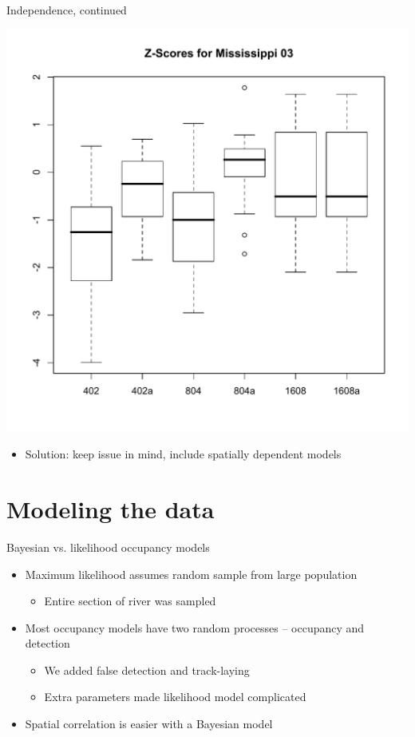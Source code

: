 \documentclass{beamer}
\begin{document}
\begin{frame}{Independence, continued}
	\begin{center}
		\includegraphics[scale=0.4]{Figures/R/independenceBoxplots.pdf}
	\end{center}
	\begin{itemize}
		\item Solution: keep issue in mind, include spatially dependent models
	\end{itemize}
\end{frame}

\section{Modeling the data}

\begin{frame}{Bayesian vs. likelihood occupancy models}
	\begin{itemize}
		\item Maximum likelihood assumes random sample from large population
		\begin{itemize}
			\item Entire section of river was sampled
		\end{itemize}
		\item Most occupancy models have two random processes -- occupancy and
		detection
		\begin{itemize}
			\item We added false detection and track-laying
			\item Extra parameters made likelihood model complicated
		\end{itemize}
		\item Spatial correlation is easier with a Bayesian model
	\end{itemize}
\end{frame}
\end{document}
